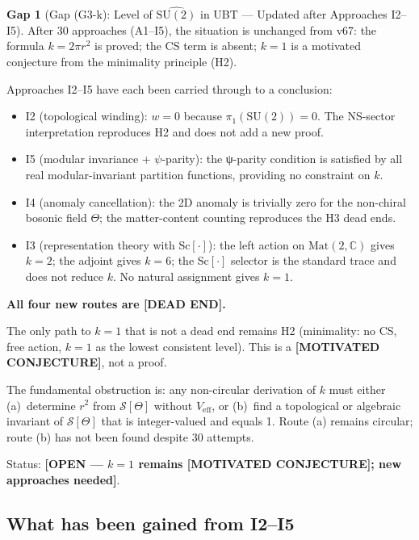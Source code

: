 \documentclass[11pt,a4paper]{article}
\theoremstyle{definition}
\newtheorem{gap}{Gap}
\theoremstyle{remark}
\begin{document}
\begin{gap}[Gap (G3-k): Level of $\widehat{\mathrm{SU}(2)}$ in UBT —
Updated after Approaches I2--I5]
  \label{gap:G3k_I5}
  After 30 approaches (A1--I5), the situation is unchanged from v67:
  the formula $k = 2\pi r^2$ is proved; the CS term is absent;
  $k = 1$ is a motivated conjecture from the minimality principle (H2).
  
  Approaches I2--I5 have each been carried through to a conclusion:
  \begin{itemize}
    \item I2 (topological winding): $w = 0$ because $\pi_1(\mathrm{SU}(2)) = 0$.
      The NS-sector interpretation reproduces H2 and does not add a new proof.
    \item I5 (modular invariance + $\psi$-parity): the ψ-parity condition
      is satisfied by all real modular-invariant partition functions,
      providing no constraint on $k$.
    \item I4 (anomaly cancellation): the 2D anomaly is trivially zero for
      the non-chiral bosonic field $\Theta$; the matter-content counting
      reproduces the H3 dead ends.
    \item I3 (representation theory with Sc$[\cdot]$): the left action
      on $\mathrm{Mat}(2,\mathbb{C})$ gives $k = 2$; the adjoint gives
      $k = 6$; the Sc$[\cdot]$ selector is the standard trace and does
      not reduce $k$.  No natural assignment gives $k = 1$.
  \end{itemize}
  \textbf{All four new routes are [DEAD END].}
  
  The only path to $k = 1$ that is not a dead end remains H2
  (minimality: no CS, free action, $k = 1$ as the lowest consistent
  level).  This is a \textbf{[MOTIVATED CONJECTURE]}, not a proof.
  
  The fundamental obstruction is: any non-circular derivation of $k$
  must either (a)~determine $r^2$ from $\mathcal{S}[\Theta]$ without
  $V_{\mathrm{eff}}$, or (b)~find a topological or algebraic invariant
  of $\mathcal{S}[\Theta]$ that is integer-valued and equals 1.
  Route (a) remains circular; route (b) has not been found despite
  30 attempts.
  
  Status: \textbf{[OPEN — $k=1$ remains [MOTIVATED CONJECTURE];
  new approaches needed]}.
\end{gap}

\subsection{What has been gained from I2--I5}
\end{document}
